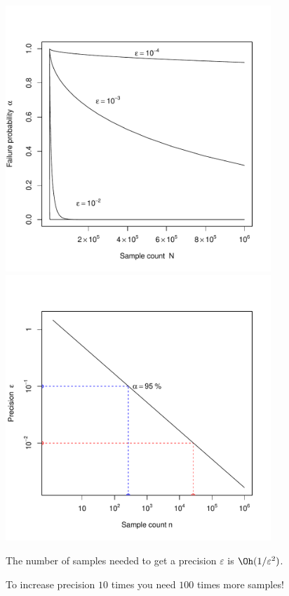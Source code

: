 \documentclass[landscape,footrule]{foils}
\begin{document}
\foilhead[-1cm]{}

\foilhead[-1cm]{}



\begin{center}
\includegraphics[width=10cm]{sampling-bound-1}\hspace*{1cm}
\includegraphics[width=10cm]{sampling-bound-2}
\end{center}
\vspace*{-0.5cm}

The number of samples needed to get a precision $\varepsilon$ is $\Oh(1/\varepsilon^2)$. 
\begin{triangles}
\item To increase precision $10$ times you need $100$ times more samples!
\end{triangles}
\end{document}
